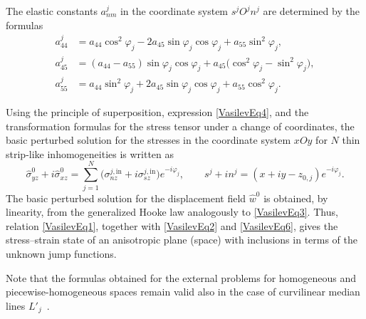 The elastic constants $a_{nm}^j$ in the coordinate system $s^jO^jn^j$ are determined by the formulas~\cite{Vasilev11,Vasilev26}
\begin{equation}
	\begin{aligned}
		a_{44}^j &= a_{44}\cos^2\varphi_j-2a_{45}\sin\varphi_j\cos\varphi_j+a_{55}\sin^2\varphi_j,\\
		a_{45}^j &= (a_{44}-a_{55})\sin\varphi_j\cos\varphi_j+a_{45}\bigl(\cos^2\varphi_j-\sin^2\varphi_j\bigr),\\
		a_{55}^j &= a_{44}\sin^2\varphi_j+2a_{45}\sin\varphi_j\cos\varphi_j+a_{55}\cos^2\varphi_j.
	\end{aligned}
	\label{VasilevEq5}
\end{equation}

Using the principle of superposition, expression \eqref{VasilevEq4}, and the transformation formulas for the stress tensor under a change of coordinates, the basic perturbed solution for the stresses in the coordinate system $xOy$ for $N$ thin strip-like inhomogeneities is written as
\begin{equation}
	\widehat{\sigma}_{yz}^{0}+i\widehat{\sigma}_{xz}^{0}
	=
	\sum_{j=1}^{N}
	\bigl(\sigma_{nz}^{j,\mathrm{in}}+i\sigma_{sz}^{j,\mathrm{in}}\bigr)e^{-i\varphi_j},
	\qquad
	s^j+in^j=(x+iy-z_{0,j})e^{-i\varphi_j}.
	\label{VasilevEq6}
\end{equation}
The basic perturbed solution for the displacement field $\widehat{w}^{0}$ is obtained, by linearity, from the generalized Hooke law analogously to \eqref{VasilevEq3}. Thus, relation \eqref{VasilevEq1}, together with \eqref{VasilevEq2} and \eqref{VasilevEq6}, gives the stress--strain state of an anisotropic plane (space) with inclusions in terms of the unknown jump functions.

Note that the formulas obtained for the external problems for homogeneous and piecewise-homogeneous spaces remain valid also in the case of curvilinear median lines $L'_j$~\cite{Vasilev25}.

